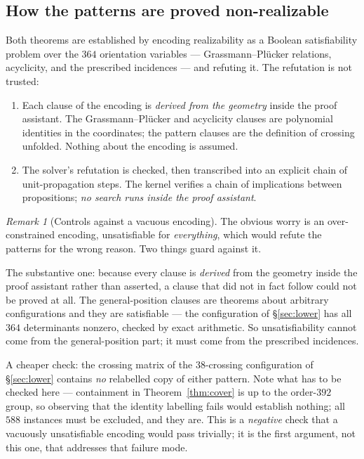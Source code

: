 \documentclass[11pt,a4paper]{article}
\theoremstyle{plain}
\theoremstyle{definition}
\theoremstyle{remark}
\newtheorem{remark}[theorem]{Remark}
\begin{document}
\subsection{How the patterns are proved non-realizable}\label{sec:howproved}

Both theorems are established by encoding realizability as a Boolean
satisfiability problem over the $364$ orientation variables --- Grassmann--Pl\"ucker
relations, acyclicity, and the prescribed incidences --- and refuting it. The
refutation is not trusted:

\begin{enumerate}[leftmargin=*]
  \item Each clause of the encoding is \emph{derived from the geometry} inside
    the proof assistant. The Grassmann--Pl\"ucker and acyclicity clauses are
    polynomial identities in the coordinates; the pattern clauses are the
    definition of crossing unfolded. Nothing about the encoding is assumed.
  \item The solver's refutation is checked, then transcribed into an explicit
    chain of unit-propagation steps. The kernel verifies a chain of
    implications between propositions; \emph{no search runs inside the
    proof assistant}.
\end{enumerate}

\begin{remark}[Controls against a vacuous encoding]\label{rem:controls}
The obvious worry is an over-constrained encoding, unsatisfiable for
\emph{everything}, which would refute the patterns for the wrong reason. Two
things guard against it.

The substantive one: because every clause is \emph{derived} from the geometry
inside the proof assistant rather than asserted, a clause that did not in fact
follow could not be proved at all. The general-position clauses are theorems
about arbitrary configurations and they are satisfiable --- the configuration of
\S\ref{sec:lower} has all $364$ determinants nonzero, checked by exact
arithmetic. So unsatisfiability cannot come from the general-position part; it
must come from the prescribed incidences.

A cheaper check: the crossing matrix of the $38$-crossing configuration of
\S\ref{sec:lower} contains \emph{no} relabelled copy of either pattern. Note
what has to be checked here --- containment in Theorem~\ref{thm:cover} is up to
the order-$392$ group, so observing that the identity labelling fails would
establish nothing; all $588$ instances must be excluded, and they are. This is a
\emph{negative} check that a vacuously unsatisfiable encoding would pass
trivially; it is the first argument, not this one, that addresses that failure
mode.
\end{remark}
\end{document}
